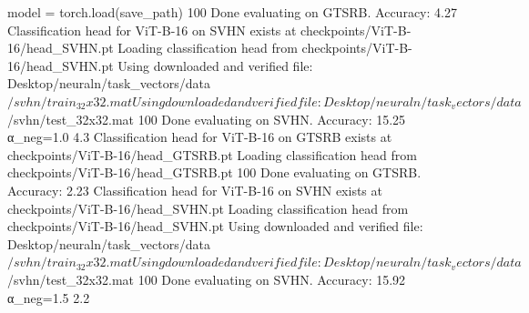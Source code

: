   model = torch.load(save_path)
100%
Done evaluating on GTSRB. Accuracy: 4.27%
Classification head for ViT-B-16 on SVHN exists at checkpoints/ViT-B-16/head_SVHN.pt
Loading classification head from checkpoints/ViT-B-16/head_SVHN.pt
Using downloaded and verified file: Desktop/neuraln/task_vectors/data$/svhn/train_32x32.mat
Using downloaded and verified file: Desktop/neuraln/task_vectors/data$/svhn/test_32x32.mat
100%
Done evaluating on SVHN. Accuracy: 15.25%
  α_neg=1.0            4.3%
Classification head for ViT-B-16 on GTSRB exists at checkpoints/ViT-B-16/head_GTSRB.pt
Loading classification head from checkpoints/ViT-B-16/head_GTSRB.pt
100%
Done evaluating on GTSRB. Accuracy: 2.23%
Classification head for ViT-B-16 on SVHN exists at checkpoints/ViT-B-16/head_SVHN.pt
Loading classification head from checkpoints/ViT-B-16/head_SVHN.pt
Using downloaded and verified file: Desktop/neuraln/task_vectors/data$/svhn/train_32x32.mat
Using downloaded and verified file: Desktop/neuraln/task_vectors/data$/svhn/test_32x32.mat
100%
Done evaluating on SVHN. Accuracy: 15.92%
  α_neg=1.5            2.2%


